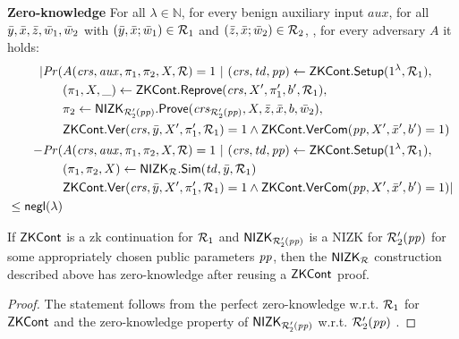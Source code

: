 \noindent \textbf{Zero-knowledge } For all $\lambda \in \mathbb{N}$, for every benign auxiliary input $aux$, 
for all $\bar{y},\bar{x},\bar{z}, \bar{w}_1, \bar{w}_2$ with $(\bar{y}, \bar{x}; \bar{w}_1) \in \mathcal{R}_1$ and $(\bar{z}, \bar{x}; \bar{w}_2) \in \mathcal{R}_2$, , for every adversary $A$ it holds:
\begin{align*}
| \mathit{Pr}(& A(\mathit{crs}, \mathit{aux}, \pi_1,\pi_2, X, \mathcal{R}) = 1 \ | \ (\mathit{crs}, \mathit{td}, \mathit{pp}) \leftarrow {\ensuremath{\mathsf{ZKCont}}}.{\mathsf{Setup}} (1^{\lambda}, \mathcal{R}_1), \\
                  &(\pi_1, X, \_) \leftarrow {\ensuremath{\mathsf{ZKCont}}}.{\mathsf{Reprove}} (\mathit{crs}, X', \pi_1', b', \mathcal{R}_1), \\
                  & \pi_2 \leftarrow {\ensuremath{\mathsf{NIZK_{\mathcal{R}'_2(\mathit{pp})}}}}.{\mathsf{Prove}}(\mathit{crs}_{\mathcal{R}'_2(\mathit{pp})}, X, \bar{z}, \bar{x}, b, \bar{w}_2), \\
                  &  {\mathsf{ZKCont}}.{\mathsf{Ver}}(\mathit{crs}, \bar{y}, X', \pi'_1, \mathcal{R}_1) = 1 
                  \wedge {\ensuremath{\mathsf{ZKCont}}}.{\mathsf{VerCom}}(\mathit{pp}, X', \bar{x}', b') = 1)   \\
- \mathit{Pr}(& A(\mathit{crs}, \mathit{aux}, \pi_1,\pi_2, X, \mathcal{R}) = 1 \ | \ (\mathit{crs}, \mathit{td}, \mathit{pp}) \leftarrow {\ensuremath{\mathsf{ZKCont}}}.{\mathsf{Setup}} (1^{\lambda}, \mathcal{R}_1), \\ 
                     & (\pi_1,\pi_2, X) \leftarrow {\ensuremath{\mathsf{NIZK_{\mathcal{R}}}}}.{\mathsf{Sim}}(\mathit{td}, \bar{y}, \mathcal{R}_1) \\ 
                     &  {\mathsf{ZKCont}}.{\mathsf{Ver}}(\mathit{crs}, \bar{y}, X', \pi'_1, \mathcal{R}_1) = 1 \wedge {\ensuremath{\mathsf{ZKCont}}}.{\mathsf{VerCom}}(\mathit{pp}, X', \bar{x}', b') = 1) | \\
                    \leq \mathsf{negl}(\lambda)
\end{align*}

\begin{lemma} 
\label{le:specialZK_for_nizkR}
If ${\mathsf{ZKCont}}$ is a zk continuation for $\mathcal{R}_1$ and ${\mathsf{NIZK_{\mathcal{R}'_2(\mathit{pp})}}}$ is a NIZK for $\mathcal{R}_2'(\mathit{pp})$ for some appropriately chosen public parameters $\mathit{pp}$, 
then the ${\mathsf{NIZK_{\mathcal{R}}}}$ construction described above has zero-knowledge after reusing a ${\mathsf{ZKCont}}$ proof.
\end{lemma} 
\begin{proof} The statement follows from the perfect zero-knowledge w.r.t. $\mathcal{R}_1$ for ${\mathsf{ZKCont}}$ and 
the zero-knowledge property of ${\mathsf{NIZK_{\mathcal{R}'_2(\mathit{pp})}}}$ w.r.t. $\mathcal{R}_2'(\mathit{pp})$ .
\end{proof}
 
